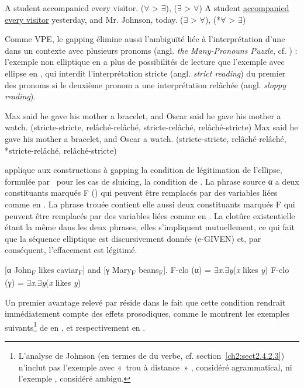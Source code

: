 \ea
\ea A student accompanied every visitor. ($\forall$ > $\exists$), ($\exists$ > $\forall$) \label{ch2:ex201a}  
\ex A student \uline{accompanied every visitor} yesterday, and Mr. Johnson, today. ($\exists$ > $\forall$), (*$\forall$ > $\exists$) \label{ch2:ex201b}  
\z
\z

Comme VPE, le gapping élimine aussi l’ambiguïté liée à l’interprétation d’une  dans un contexte avec plusieurs pronoms (angl. \textit{the Many-Pronouns Puzzle}, cf. \citealt{FiengoEtAl1994}) : l’exemple non elliptique en  a plus de possibilités de lecture que l’exemple avec ellipse en , qui interdit l’interprétation stricte (angl. \textit{strict reading}) du premier des pronoms si le deuxième pronom a une interprétation relâchée (angl. \textit{sloppy reading}). 

\ea
\ea Max said he gave his mother a bracelet, and Oscar said he gave his mother a watch. (stricte-stricte, relâché-relâché, stricte-relâché, relâché-stricte) \label{ch2:ex202a}
\ex Max said he gave his mother a bracelet, and Oscar a watch. (stricte-stricte, relâché-relâché, *stricte-relâché, relâché-stricte) \label{ch2:ex202b}
\z
\z

\citet{Coppock2001} applique aux constructions à gapping la condition de légitimation de l’ellipse, formulée par \citet{Merchant2001}~pour les cas de sluicing, {\cad} la condition de . La phrase source α a deux constituants marqués F () qui peuvent être remplacés par des variables liées comme en . La phrase trouée contient elle aussi deux constituants marqués F qui peuvent être remplacés par des variables liées comme en . La clotûre existentielle étant la même dans les deux phrases, elles s’impliquent mutuellement, ce qui fait que la séquence elliptique est discursivement donnée (e-GIVEN) et, par conséquent, l’effacement est légitimé. 

\ea
\ea {} [α John\textsubscript{F} likes caviar\textsubscript{F}] and [γ Mary\textsubscript{F} beans\textsubscript{F}]. \label{ch2:ex203a}  
\ex F-clo (α) = $\exists$\textit{x}.$\exists$\textit{y}(\textit{x} likes \textit{y}) \label{ch2:ex203b}
\ex F-clo (γ) = $\exists$\textit{x}.$\exists$\textit{y}(\textit{x} likes \textit{y})
\z
\z

Un premier avantage relevé par \citet{Coppock2001} réside dans le fait que cette condition rendrait immédiatement compte des effets prosodiques, comme le mon\-trent les exemples suivants\footnote{
 L’analyse de Johnson (en termes de  du verbe, cf. section~\ref{ch2:sect2.4.2.3}) n’inclut pas l’exemple avec «~trou à distance~» , considéré agrammatical, ni l’exemple , considéré ambigu.} de \citet{Sag1980} en , et respectivement \citet{Hankamer1973} en .

